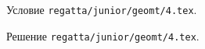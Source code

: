 \problem
Условие \texttt{regatta/junior/geomt/4.tex}.

\solution Решение \texttt{regatta/junior/geomt/4.tex}.
\endproblem
